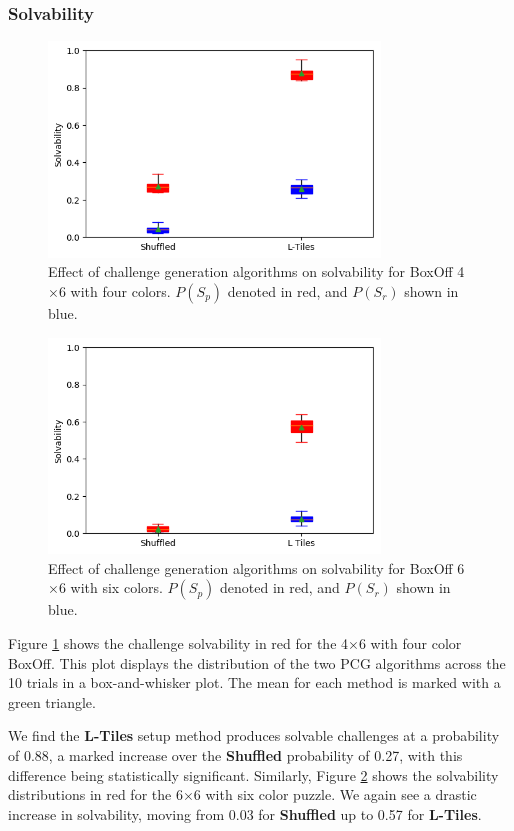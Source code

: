 \documentclass[journal]{IEEEtran}
\begin{document}
\subsubsection{Solvability}

\begin{figure}[t]
\includegraphics[width=8.8cm]{boxonsolve.png}
\caption{Effect of challenge generation algorithms on solvability for BoxOff 4$\times$6 with four colors. $P(S_p)$ denoted in red, and $P(S_r)$ shown in blue.}
\label{fig:boxoffsolvediff}
\end{figure}

\begin{figure}[t]
\includegraphics[width=8.8cm]{6x6solvediff.png}
\caption{Effect of challenge generation algorithms on solvability for BoxOff 6$\times$6 with six colors. $P(S_p)$ denoted in red, and $P(S_r)$ shown in blue.}
\label{fig:boxoff666solvediff}
\end{figure}

Figure \ref{fig:boxoffsolvediff} shows the challenge solvability in red for the 4$\times$6 with four color BoxOff. This plot displays the distribution of the two PCG algorithms across the 10 trials in a box-and-whisker plot. The mean for each method is marked with a green triangle. 

We find the {\bf L-Tiles} setup method produces solvable challenges at a probability of 0.88, a marked increase over the {\bf Shuffled} probability of 0.27, with this difference being statistically significant.
Similarly, Figure \ref{fig:boxoff666solvediff} shows the solvability distributions in red for the 6$\times$6 with six color puzzle. We again see a drastic increase in solvability, moving from 0.03 for {\bf Shuffled} up to 0.57 for {\bf L-Tiles}. 
\end{document}

